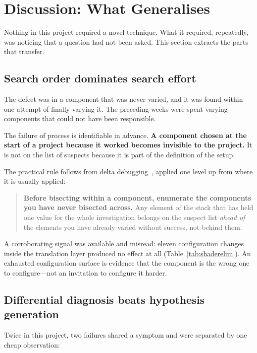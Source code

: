 \section{Discussion: What Generalises}
\label{sec:lessons}

Nothing in this project required a novel technique. What it required, repeatedly,
was noticing that a question had not been asked. This section extracts the parts
that transfer.

\subsection{Search order dominates search effort}

The defect was in a component that was never varied, and it was found within one
attempt of finally varying it. The preceding weeks were spent varying components
that could not have been responsible.

The failure of process is identifiable in advance. \textbf{A component chosen at
the start of a project because it worked becomes invisible to the project.} It is
not on the list of suspects because it is part of the definition of the setup.

The practical rule follows from delta debugging~\cite{zeller2002}, applied one
level up from where it is usually applied:

\begin{quote}
\textbf{Before bisecting within a component, enumerate the components you have
never bisected across.} Any element of the stack that has held one value for the
whole investigation belongs on the suspect list \emph{ahead of} the elements you
have already varied without success, not behind them.
\end{quote}

A corroborating signal was available and misread: eleven configuration changes
inside the translation layer produced no effect at all (Table~\ref{tab:shaderelim}).
An exhausted configuration surface is evidence that the component is the wrong
one to configure---not an invitation to configure it harder.

\subsection{Differential diagnosis beats hypothesis generation}

Twice in this project, two failures shared a symptom and were separated by one
cheap observation:

